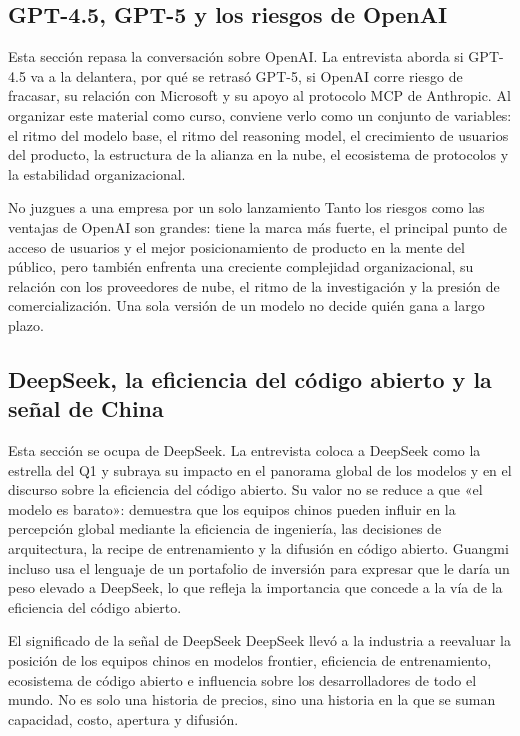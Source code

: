 \documentclass[a4paper]{article}
\begin{document}
\subsection{GPT-4.5, GPT-5 y los riesgos de OpenAI}

Esta sección repasa la conversación sobre OpenAI. La entrevista aborda si GPT-4.5 va a la delantera, por qué se retrasó GPT-5, si OpenAI corre riesgo de fracasar, su relación con Microsoft y su apoyo al protocolo MCP de Anthropic. Al organizar este material como curso, conviene verlo como un conjunto de variables: el ritmo del modelo base, el ritmo del reasoning model, el crecimiento de usuarios del producto, la estructura de la alianza en la nube, el ecosistema de protocolos y la estabilidad organizacional.

\begin{warningbox}{No juzgues a una empresa por un solo lanzamiento}
Tanto los riesgos como las ventajas de OpenAI son grandes: tiene la marca más fuerte, el principal punto de acceso de usuarios y el mejor posicionamiento de producto en la mente del público, pero también enfrenta una creciente complejidad organizacional, su relación con los proveedores de nube, el ritmo de la investigación y la presión de comercialización. Una sola versión de un modelo no decide quién gana a largo plazo.
\end{warningbox}

\subsection{DeepSeek, la eficiencia del código abierto y la señal de China}

Esta sección se ocupa de DeepSeek. La entrevista coloca a DeepSeek como la estrella del Q1 y subraya su impacto en el panorama global de los modelos y en el discurso sobre la eficiencia del código abierto. Su valor no se reduce a que «el modelo es barato»: demuestra que los equipos chinos pueden influir en la percepción global mediante la eficiencia de ingeniería, las decisiones de arquitectura, la recipe de entrenamiento y la difusión en código abierto. Guangmi incluso usa el lenguaje de un portafolio de inversión para expresar que le daría un peso elevado a DeepSeek, lo que refleja la importancia que concede a la vía de la eficiencia del código abierto.

\begin{importantbox}{El significado de la señal de DeepSeek}
DeepSeek llevó a la industria a reevaluar la posición de los equipos chinos en modelos frontier, eficiencia de entrenamiento, ecosistema de código abierto e influencia sobre los desarrolladores de todo el mundo. No es solo una historia de precios, sino una historia en la que se suman capacidad, costo, apertura y difusión.
\end{importantbox}
\end{document}
